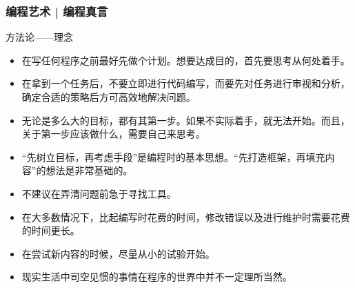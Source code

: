 \begin{frame}
  \frametitle{编程艺术 | 编程真言}
  \begin{block}{方法论——理念}
    \begin{itemize}
      \item 在写任何程序之前最好先做个\alert{计划}。想要达成目的，首先要思考从何处着手。
      \item 在拿到一个任务后，不要立即进行代码编写，而要先对任务进行\alert{审视和分析}，确定合适的策略后方可高效地解决问题。
      \item 无论是多么大的目标，都有其第一步。如果不实际着手，就无法开始。而且，关于第一步应该做什么，需要自己来思考。
      \item “\alert{先树立目标，再考虑手段}”是编程时的基本思想。“\alert{先打造框架，再填充内容}”的想法是非常基础的。
      \item 不建议在弄清问题前急于寻找工具。
      \item 在大多数情况下，比起编写时花费的时间，\alert{修改错误以及进行维护时需要花费的时间更长}。
    \item 在尝试新内容的时候，尽量从\alert{小的试验}开始。
      \item 现实生活中司空见惯的事情在程序的世界中并不一定理所当然。
    \end{itemize}
  \end{block}
\end{frame}

